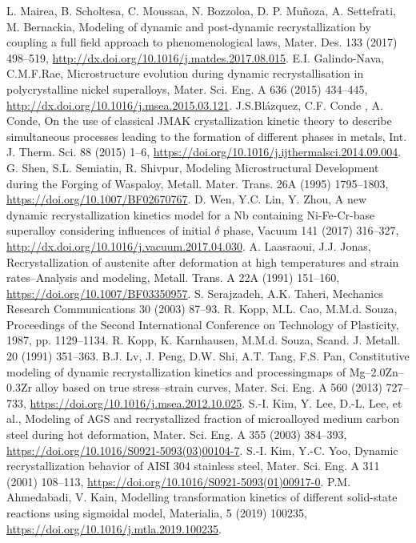 \documentclass[a4paper, 11pt, dvipsnames]{article}
\begin{document}
\begin{thebibliography}{99}
 L. Mairea, B. Scholtesa, C. Moussaa, N. Bozzoloa, D. P. Muñoza, A. Settefrati, M. Bernackia, Modeling of dynamic and post-dynamic recrystallization by coupling a full field approach to phenomenological laws, Mater. Des. 133 (2017) 498--519, \url{http://dx.doi.org/10.1016/j.matdes.2017.08.015}.
 E.I. Galindo-Nava, C.M.F.Rae, Microstructure evolution during dynamic recrystallisation in polycrystalline nickel superalloys, Mater. Sci. Eng. A 636 (2015) 434--445, \url{http://dx.doi.org/10.1016/j.msea.2015.03.121}.
 J.S.Blázquez, C.F. Conde , A. Conde, On the use of classical JMAK crystallization kinetic theory to describe simultaneous processes leading to the formation of different phases in metals, Int. J. Therm. Sci. 88 (2015) 1–6, \url{https://doi.org/10.1016/j.ijthermalsci.2014.09.004}. 
 G. Shen, S.L. Semiatin, R. Shivpur, Modeling Microstructural Development during the Forging of Waspaloy, Metall. Mater. Trans. 26A (1995) 1795--1803, \url{https://doi.org/10.1007/BF02670767}.
 D. Wen, Y.C. Lin, Y. Zhou, A new dynamic recrystallization kinetics model for a Nb containing Ni-Fe-Cr-base superalloy considering influences of initial $\delta$ phase, Vacuum 141 (2017) 316--327, \url{http://dx.doi.org/10.1016/j.vacuum.2017.04.030}.
 A. Laasraoui, J.J. Jonas, Recrystallization of austenite after deformation at high temperatures and strain rates--Analysis and modeling, Metall. Trans. A 22A (1991) 151--160, \url{https://doi.org/10.1007/BF03350957}.
 S. Serajzadeh, A.K. Taheri, Mechanics Research Communications 30 (2003) 87--93.
 R. Kopp, M.L. Cao, M.M.d. Souza, Proceedings of the Second International Conference
on Technology of Plasticity, 1987, pp. 1129--1134.
 R. Kopp, K. Karnhausen, M.M.d. Souza, Scand. J. Metall. 20 (1991) 351--363.
 B.J. Lv, J. Peng, D.W. Shi, A.T. Tang, F.S. Pan, Constitutive modeling of dynamic recrystallization kinetics and processingmaps of Mg–2.0Zn–0.3Zr alloy based on true stress–strain curves, Mater. Sci. Eng. A 560 (2013) 727--733, \url{https://doi.org/10.1016/j.msea.2012.10.025}.
 S.-I. Kim, Y. Lee, D.-L. Lee, et al., Modeling of AGS and recrystallized fraction of microalloyed medium carbon steel during hot deformation, Mater. Sci. Eng. A 355 (2003) 384–393, \url{https://doi.org/10.1016/S0921-5093(03)00104-7}.
 S.-I. Kim, Y.-C. Yoo, Dynamic recrystallization behavior of AISI 304 stainless steel, Mater. Sci. Eng. A 311 (2001) 108--113, \url{https://doi.org/10.1016/S0921-5093(01)00917-0}.
 P.M. Ahmedabadi, V. Kain, Modelling transformation kinetics of different solid-state reactions using sigmoidal model, Materialia, 5 (2019) 100235, \url{https://doi.org/10.1016/j.mtla.2019.100235}.

\end{thebibliography}
\end{document}
